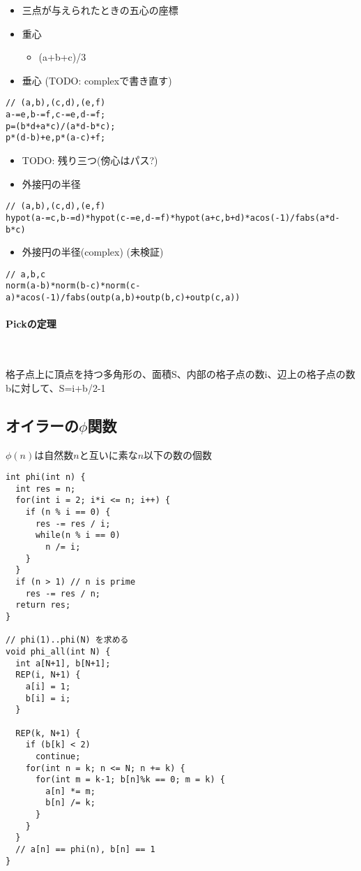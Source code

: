 \begin{itemize}
\item{三点が与えられたときの五心の座標}
\item{重心}
\begin{itemize}
\item{(a+b+c)/3}
\end{itemize}
\item{垂心 (TODO: complexで書き直す)}
\end{itemize}
\begin{lstlisting}
// (a,b),(c,d),(e,f)
a-=e,b-=f,c-=e,d-=f;
p=(b*d+a*c)/(a*d-b*c);
p*(d-b)+e,p*(a-c)+f;
\end{lstlisting}
\begin{itemize}
\item{TODO: 残り三つ(傍心はパス?)}
\item{外接円の半径}
\end{itemize}
\begin{lstlisting}
// (a,b),(c,d),(e,f)
hypot(a-=c,b-=d)*hypot(c-=e,d-=f)*hypot(a+c,b+d)*acos(-1)/fabs(a*d-b*c)
\end{lstlisting}
\begin{itemize}
\item{外接円の半径(complex) (未検証)}
\end{itemize}
\begin{lstlisting}
// a,b,c
norm(a-b)*norm(b-c)*norm(c-a)*acos(-1)/fabs(outp(a,b)+outp(b,c)+outp(c,a))
\end{lstlisting}


\paragraph{Pickの定理}　

格子点上に頂点を持つ多角形の、面積S、内部の格子点の数i、辺上の格子点の数bに対して、S=i+b/2-1





\subsection{オイラーの$\phi$関数}

$\phi(n)$は自然数$n$と互いに素な$n$以下の数の個数

\begin{lstlisting}
int phi(int n) {
  int res = n;
  for(int i = 2; i*i <= n; i++) {
    if (n % i == 0) {
      res -= res / i;
      while(n % i == 0)
        n /= i;
    }
  }
  if (n > 1) // n is prime
    res -= res / n;
  return res;
}
 
// phi(1)..phi(N) を求める
void phi_all(int N) {
  int a[N+1], b[N+1];
  REP(i, N+1) {
    a[i] = 1;
    b[i] = i;
  }
 
  REP(k, N+1) {
    if (b[k] < 2)
      continue;
    for(int n = k; n <= N; n += k) {
      for(int m = k-1; b[n]%k == 0; m = k) {
        a[n] *= m;
        b[n] /= k;
      }
    }
  }
  // a[n] == phi(n), b[n] == 1
}
\end{lstlisting}

